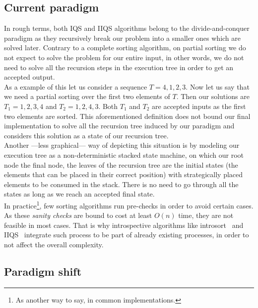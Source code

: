 \subsection{Current paradigm}
In rough terms, both IQS and IIQS algorithms belong to the divide-and-conquer paradigm as they recursively break our problem into a smaller ones which are solved later. Contrary to a complete sorting algorithm, on partial sorting we do not expect to solve the problem for our entire input, in other words, we do not need to solve all the recursion steps in the execution tree in order to get an accepted output. \\

As a example of this let us consider a sequence $T={4,1,2,3}$. Now let us say that we need a partial sorting over the first two elements of $T$. Then our solutions are $T_1={1,2,3,4}$ and $T_2={1,2,4,3}$. Both $T_1$ and $T_2$ are accepted inputs as the first two elements are sorted. This aforementioned definition does not bound our final implementation to solve all the recursion tree induced by our paradigm and considers this solution as a state of our recursion tree. \\

Another ---less graphical--- way of depicting this situation is by modeling our execution tree as a non-deterministic stacked state machine, on which our root node the final node, the leaves of the recursion tree are the initial states (the elements that can be placed in their correct position) with strategically placed elements to be consumed in the stack. There is no need to go through all the states as long as we reach an accepted final state.\\


In practice\footnote{As another way to say, in common implementations.}, few sorting algorithms run pre-checks in order to avoid certain cases. As these \emph{sanity checks} are bound to cost at least $O(n)$ time, they are not feasible in most cases. That is why introspective algorithms like introsort~\cite{10.5555/261387.261395} and IIQS~\cite{7416566} integrate such process to be part of already existing processes, in order to not affect the overall complexity. \\

\subsection{Paradigm shift}

